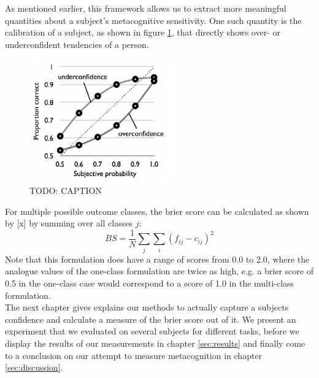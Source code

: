 \documentclass[../main/main.tex]{subfiles}
\begin{document}
	As mentioned earlier, this framework allows us to extract more meaningful quantities about a subject's metacognitive sensitivity. One such quantity is the calibration of a subject, as shown in figure \ref{fig:calibration}, that directly shows over- or underconfident tendencies of a person.
	\begin{figure}[h]
		\centering
		\captionsetup{justification=centering}
		\includegraphics[width=0.55\textwidth]{../assets/calibration_curve.png}
		\caption{TODO: CAPTION} 
		\label{fig:calibration}
	\end{figure}
	For multiple possible outcome classes, the brier score can be calculated as shown by [x] by summing over all classes $j$:
	\begin{displaymath}
		BS = \frac{1}{N}\sum_j\sum_i(f_{ij} - c_{ij})^2
	\end{displaymath}
	Note that this formulation does have a range of scores from 0.0 to 2.0, where the analogue values of the one-class formulation are twice as high, e.g. a brier score of 0.5 in the one-class case would correspond to a score of 1.0 in the multi-class formulation.\\
	The next chapter gives explains our methods to actually capture a subjects confidence and calculate a measure of the brier score out of it. We present an experiment that we evaluated on several subjects for different tasks, before we display the results of our measurements in chapter \ref{sec:results} and finally come to a conclusion on our attempt to measure metacognition in chapter \ref{sec:discussion}.
	
\end{document}
